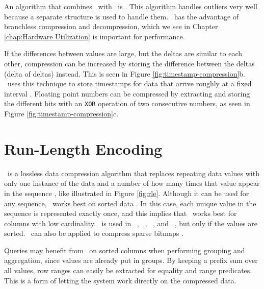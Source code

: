 An algorithm that combines \dele~with \bp~is \pfdelta \cite{Bjorklund2011-wh}. This algorithm handles outliers very well because a separate structure is used to handle them. \pfdelta~has the advantage of branchless compression and decompression, which we see in Chapter \ref{chap:Hardware Utilization} is important for performance.


If the differences between values are large, but the deltas are similar to each other, compression can be increased by storing the difference between the deltas (delta of deltas) instead. This is seen in Figure \ref{fig:timestamp-compression}b. \gorilla~uses this technique to store timestamps for data that arrive roughly at a fixed interval \cite{Pelkonen2015-ko}. Floating point numbers can be compressed by extracting and storing the different bits with an \texttt{XOR} operation of two consecutive numbers, as seen in Figure \ref{fig:timestamp-compression}c.

\section{Run-Length Encoding}
\label{sec:Run-Length Encoding}
\rle~is a lossless data compression algorithm that replaces repeating data values with only one instance of the data and a number of how many times that value appear in the sequence \cite{Stoimen_undated-js}, like illustrated in Figure \ref{fig:rle}. Although it can be used for any sequence, \rle~works best on sorted data \cite{Bjorklund2011-wh, Holloway2008-rr}. In this case, each unique value in the sequence is represented exactly once, and this implies that \rle~works best for columns with low cardinality. \rle~is used in \cstore~\cite{Stonebraker2005-qz}, \vertica~\cite{Lamb2012-kg}, \oracle~\cite{Oracle2015-fs}, and \sapnw~\cite{Lemke2010-is}, but only if the values are sorted. \rle~can also be applied to compress sparse bitmaps \cite{Stonebraker2005-qz}.

Queries may benefit from \rle~on sorted columns when performing grouping and aggregation, since values are already put in groups. By keeping a prefix sum over all values, row ranges can easily be extracted for equality and range predicates. This is a form of letting the system work directly on the compressed data. 

